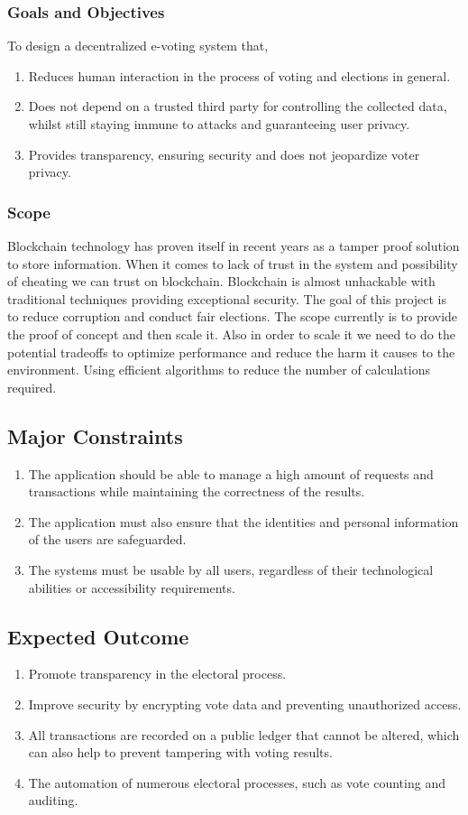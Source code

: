 \documentclass[oneside, 12pt]{book}
\begin{document}
			\subsubsection{Goals and Objectives}
				To design a decentralized e-voting system that,
				\begin{enumerate}
					\item Reduces human interaction in the process of voting and elections in general. 
					\item Does not depend on a trusted third party for controlling the collected data, whilst still staying immune to attacks and guaranteeing user privacy.
					\item Provides transparency, ensuring security and does not jeopardize voter privacy.
				\end{enumerate}
			\subsubsection{Scope}
				Blockchain technology has proven itself in recent years as a tamper proof solution to store information. When it comes to lack of trust in the system and possibility of cheating we can trust on blockchain. Blockchain is almost unhackable with traditional techniques providing exceptional security. The goal of this project is to reduce corruption and conduct fair elections. The scope currently is to provide the proof of concept and then scale it. Also in order to scale it we need to do the potential tradeoffs to optimize performance and reduce the harm it causes to the environment. Using efficient algorithms to reduce the number of calculations required.
		\subsection{Major Constraints}
			\begin{enumerate}
				\item The application should be able to manage a high amount of requests and transactions while maintaining the correctness of the results.
				\item The application must also ensure that the identities and personal information of the users are safeguarded.
				\item The systems must be usable by all users, regardless of their technological abilities or accessibility requirements.
			\end{enumerate}
		\subsection{Expected Outcome}
			\begin{enumerate}
				\item Promote transparency in the electoral process.
				\item Improve security by encrypting vote data and preventing unauthorized access.
				\item All transactions are recorded on a public ledger that cannot be altered, which can also help to prevent tampering with voting results.
				\item The automation of numerous electoral processes, such as vote counting and auditing.
			\end{enumerate}
\end{document}
